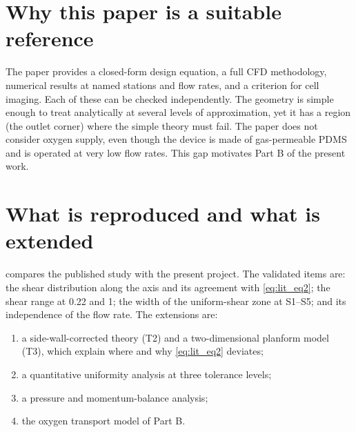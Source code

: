\section{Why this paper is a suitable reference}

The paper provides a closed-form design equation, a full CFD methodology, numerical results at named stations and flow rates, and a criterion for cell imaging. Each of these can be checked independently. The geometry is simple enough to treat analytically at several levels of approximation, yet it has a region (the outlet corner) where the simple theory must fail. The paper does not consider oxygen supply, even though the device is made of gas-permeable PDMS and is operated at very low flow rates. This gap motivates Part B of the present work.

\section{What is reproduced and what is extended}

 compares the published study with the present project. The validated items are: the shear distribution along the axis and its agreement with \cref{eq:lit_eq2}; the shear range at 0.22 and \SI{1}{\uLmin}; the width of the uniform-shear zone at S1--S5; and its independence of the flow rate. The extensions are:
\begin{enumerate}[label=(\alph*)]
\item a side-wall-corrected theory (T2) and a two-dimensional planform model (T3), which explain where and why \cref{eq:lit_eq2} deviates;
\item a quantitative uniformity analysis at three tolerance levels;
\item a pressure and momentum-balance analysis;
\item the oxygen transport model of Part B.
\end{enumerate}

